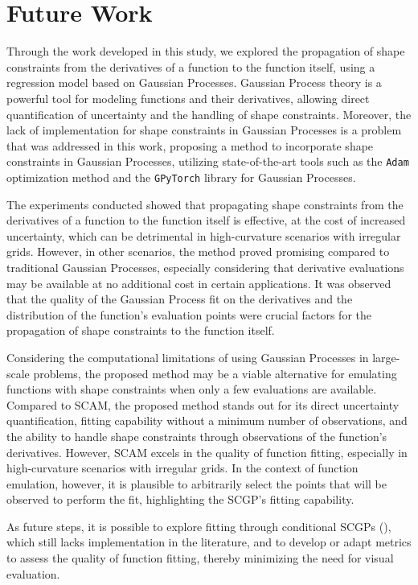 \section{Future Work}

Through the work developed in this study, we explored the propagation of shape constraints from the derivatives of a function to the function itself, using a regression model based on Gaussian Processes.
Gaussian Process theory is a powerful tool for modeling functions and their derivatives, allowing direct quantification of uncertainty and the handling of shape constraints.
Moreover, the lack of implementation for shape constraints in Gaussian Processes is a problem that was addressed in this work, proposing a method to incorporate shape constraints in Gaussian Processes, utilizing state-of-the-art tools such as the \texttt{Adam} optimization method and the \texttt{GPyTorch} library for Gaussian Processes.

The experiments conducted showed that propagating shape constraints from the derivatives of a function to the function itself is effective, at the cost of increased uncertainty, which can be detrimental in high-curvature scenarios with irregular grids.
However, in other scenarios, the method proved promising compared to traditional Gaussian Processes, especially considering that derivative evaluations may be available at no additional cost in certain applications.
It was observed that the quality of the Gaussian Process fit on the derivatives and the distribution of the function’s evaluation points were crucial factors for the propagation of shape constraints to the function itself.

Considering the computational limitations of using Gaussian Processes in large-scale problems, the proposed method may be a viable alternative for emulating functions with shape constraints when only a few evaluations are available.
Compared to SCAM, the proposed method stands out for its direct uncertainty quantification, fitting capability without a minimum number of observations, and the ability to handle shape constraints through observations of the function’s derivatives. However, SCAM excels in the quality of function fitting, especially in high-curvature scenarios with irregular grids.
In the context of function emulation, however, it is plausible to arbitrarily select the points that will be observed to perform the fit, highlighting the SCGP's fitting capability.

As future steps, it is possible to explore fitting through conditional SCGPs (), which still lacks implementation in the literature, and to develop or adapt metrics to assess the quality of function fitting, thereby minimizing the need for visual evaluation.

